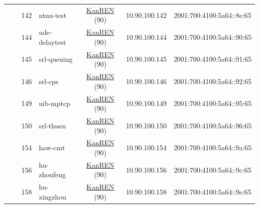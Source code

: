 \begin{small}
\begin{center}
\begin{longtable}{|c|c|c|c|c|c|c|c|}
  &  & \tiny{142} & \multicolumn{1}{|l|}{\tiny{ntnu-test}} & \multicolumn{2}{|c|}{\tiny{\href{http://www.kanren.net}{KanREN} (90)}} & \tiny{10.90.100.142} & \tiny{2001:700:4100:5a64::8e:65} \\* \cline{3-3}\cline{4-4}\cline{5-5}\cline{6-6}\cline{7-7}\cline{8-8}
  &  & \tiny{144} & \multicolumn{1}{|l|}{\tiny{ude-delaytest}} & \multicolumn{2}{|c|}{\tiny{\href{http://www.kanren.net}{KanREN} (90)}} & \tiny{10.90.100.144} & \tiny{2001:700:4100:5a64::90:65} \\* \cline{3-3}\cline{4-4}\cline{5-5}\cline{6-6}\cline{7-7}\cline{8-8}
  &  & \tiny{145} & \multicolumn{1}{|l|}{\tiny{srl-queuing}} & \multicolumn{2}{|c|}{\tiny{\href{http://www.kanren.net}{KanREN} (90)}} & \tiny{10.90.100.145} & \tiny{2001:700:4100:5a64::91:65} \\* \cline{3-3}\cline{4-4}\cline{5-5}\cline{6-6}\cline{7-7}\cline{8-8}
  &  & \tiny{146} & \multicolumn{1}{|l|}{\tiny{srl-cps}} & \multicolumn{2}{|c|}{\tiny{\href{http://www.kanren.net}{KanREN} (90)}} & \tiny{10.90.100.146} & \tiny{2001:700:4100:5a64::92:65} \\* \cline{3-3}\cline{4-4}\cline{5-5}\cline{6-6}\cline{7-7}\cline{8-8}
  &  & \tiny{149} & \multicolumn{1}{|l|}{\tiny{uib-mptcp}} & \multicolumn{2}{|c|}{\tiny{\href{http://www.kanren.net}{KanREN} (90)}} & \tiny{10.90.100.149} & \tiny{2001:700:4100:5a64::95:65} \\* \cline{3-3}\cline{4-4}\cline{5-5}\cline{6-6}\cline{7-7}\cline{8-8}
  &  & \tiny{150} & \multicolumn{1}{|l|}{\tiny{srl-thuen}} & \multicolumn{2}{|c|}{\tiny{\href{http://www.kanren.net}{KanREN} (90)}} & \tiny{10.90.100.150} & \tiny{2001:700:4100:5a64::96:65} \\* \cline{3-3}\cline{4-4}\cline{5-5}\cline{6-6}\cline{7-7}\cline{8-8}
  &  & \tiny{154} & \multicolumn{1}{|l|}{\tiny{haw-cmt}} & \multicolumn{2}{|c|}{\tiny{\href{http://www.kanren.net}{KanREN} (90)}} & \tiny{10.90.100.154} & \tiny{2001:700:4100:5a64::9a:65} \\* \cline{3-3}\cline{4-4}\cline{5-5}\cline{6-6}\cline{7-7}\cline{8-8}
  &  & \tiny{156} & \multicolumn{1}{|l|}{\tiny{hu-zhoufeng}} & \multicolumn{2}{|c|}{\tiny{\href{http://www.kanren.net}{KanREN} (90)}} & \tiny{10.90.100.156} & \tiny{2001:700:4100:5a64::9c:65} \\* \cline{3-3}\cline{4-4}\cline{5-5}\cline{6-6}\cline{7-7}\cline{8-8}
  &  & \tiny{158} & \multicolumn{1}{|l|}{\tiny{hu-xingzhou}} & \multicolumn{2}{|c|}{\tiny{\href{http://www.kanren.net}{KanREN} (90)}} & \tiny{10.90.100.158} & \tiny{2001:700:4100:5a64::9e:65} \\* \cline{3-3}\cline{4-4}\cline{5-5}\cline{6-6}\cline{7-7}\cline{8-8}

\end{longtable}
\end{center}
\end{small}
